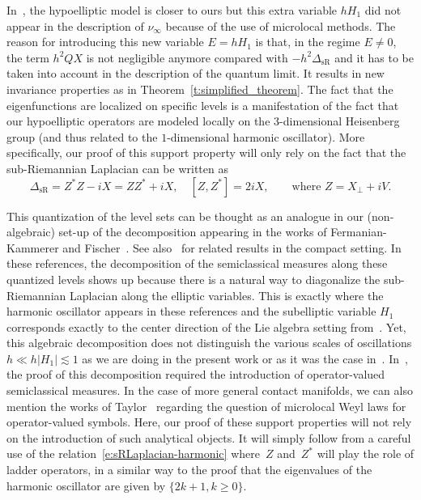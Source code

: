 \documentclass[10pt]{amsart}
\theoremstyle{plain}
\theoremstyle{definition}
\theoremstyle{remark}
\begin{document}
In~\cite{ColindeVerdiereHillairetTrelat15}, the hypoelliptic model is closer to ours but this extra variable $hH_1$ did not appear in the description of $\nu_\infty$ because of the use of microlocal methods. The reason for introducing this new variable $E=hH_1$ is that, in the regime $E\neq 0$, the term $h^2QX$ is not negligible anymore compared with $-h^2\Delta_{\text{sR}}$ and it has to be taken into account in the description of the quantum limit. It results in new invariance properties as in Theorem~\ref{t:simplified_theorem}. The fact that the eigenfunctions are localized on specific levels is a manifestation of the fact that our hypoelliptic operators are modeled locally on the $3$-dimensional Heisenberg group (and thus related to the $1$\nobreakdash-dimensional harmonic oscillator). More specifically, our proof of this support property will only rely on the fact that the sub-Riemannian Laplacian can be written as
\begin{equation}\label{e:sRLaplacian-harmonic}
\Delta_{\text{sR}}=Z^*Z-iX=ZZ^*+iX,\quad [Z,Z^*]=2iX,\qquad\text{where $Z=X_\perp+i V$.}
\end{equation}

This quantization of the level sets can be thought as an analogue in our (non-algebraic) set-up of the decomposition appearing in the works of Fermanian-Kammerer and Fischer~\cite[Th.\,1.1, Th.\,2.10]{FermanianFischer21}. See also~\cite{FermanianLetrouit20} for related results in the compact setting. In these references, the decomposition of the semiclassical measures along these quantized levels shows up because there is a natural way to diagonalize the sub-Riemannian Laplacian along the elliptic variables. This is exactly where the harmonic oscillator appears in these references and the subelliptic variable $H_1$ corresponds exactly to the center direction of the Lie algebra setting from~\cite{FermanianFischer21, FermanianLetrouit20}. Yet, this algebraic decomposition does not distinguish the various scales of oscillations $h\ll h|H_1|\lesssim 1$ as we are doing in the present work or as it was the case in~\cite{BurqSun22, ArnaizSun22}. In~\cite{FermanianFischer21, FermanianLetrouit20}, the proof of this decomposition required the introduction of operator-valued semiclassical measures. In the case of more general contact manifolds, we can also mention the works of Taylor~\cite{Taylor20} regarding the question of microlocal Weyl laws for operator-valued symbols. Here, our proof of these support properties will not rely on the introduction of such analytical objects. It will simply follow from a careful use of the relation~\eqref{e:sRLaplacian-harmonic} where~$Z$ and~$Z^*$ will play the role of ladder operators, in a similar way to the proof that the eigenvalues of the harmonic oscillator are given by $\{2k+1, k\geq 0\}$.
\end{document}
